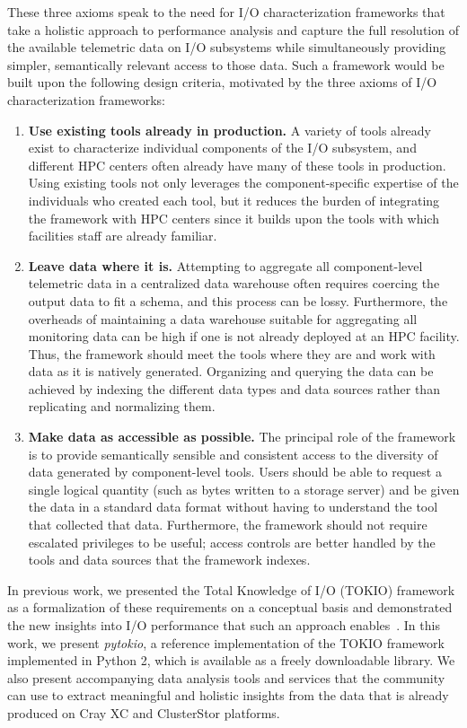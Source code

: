 These three axioms speak to the need for I/O characterization frameworks that take a holistic approach to performance analysis and capture the full resolution of the available telemetric data on I/O subsystems while simultaneously providing simpler, semantically relevant access to those data.
Such a framework would be built upon the following design criteria, motivated by the three axioms of I/O characterization frameworks:

\begin{enumerate}[leftmargin=*]
\item \label{design:existingtools} \textbf{Use existing tools already in production.}
A variety of tools already exist to characterize individual components of the I/O subsystem, and different HPC centers often already have many of these tools in production.
Using existing tools not only leverages the component-specific expertise of the individuals who created each tool, but it reduces the burden of integrating the framework with HPC centers since it builds upon the tools with which facilities staff are already familiar.

\item \label{design:leavedata} \textbf{Leave data where it is.}
Attempting to aggregate all component-level telemetric data in a centralized data warehouse often requires coercing the output data to fit a schema, and this process can be lossy.
Furthermore, the overheads of maintaining a data warehouse suitable for aggregating all monitoring data can be high if one is not already deployed at an HPC facility.
Thus, the framework should meet the tools where they are and work with data as it is natively generated. 
Organizing and querying the data can be achieved by indexing the different data types and data sources rather than replicating and normalizing them.

\item \label{design:accessible} \textbf{Make data as accessible as possible.}
The principal role of the framework is to provide semantically sensible and consistent access to the diversity of data generated by component-level tools.
Users should be able to request a single logical quantity (such as bytes written to a storage server) and be given the data in a standard data format without having to understand the tool that collected that data.
Furthermore, the framework should not require escalated privileges to be useful; access controls are better handled by the tools and data sources that the framework indexes.
\end{enumerate}

In previous work, we presented the Total Knowledge of I/O (TOKIO) framework as a formalization of these requirements on a conceptual basis and demonstrated the new insights into I/O performance that such an approach enables~\cite{Lockwood2017}.
In this work, we present \emph{pytokio}, a reference implementation of the TOKIO framework implemented  in Python 2, which is available as a freely downloadable library.
We also present accompanying data analysis tools and services that the community can use to extract meaningful and holistic insights from the data that is already produced on Cray XC and ClusterStor platforms.
